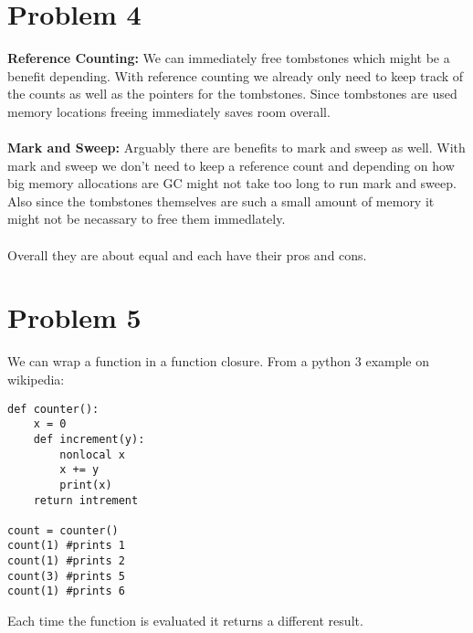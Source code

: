 \documentclass{article}
\begin{document}
\section*{Problem 4}
\textbf{Reference Counting:} We can immediately free tombstones which 
might be a benefit depending. With reference counting we already only need
to keep track of the counts as well as the pointers for the tombstones. 
Since tombstones are used memory locations freeing immediately saves
room overall. \\ \\
\textbf{Mark and Sweep:} Arguably there are benefits to mark and sweep as
well. With mark and sweep we don't need to keep a reference count and depending on how big memory allocations are GC might not take too long to 
run mark and sweep. Also since the tombstones themselves are such a small
amount of memory it might not be necassary to free them immedlately.\\ \\
Overall they are about equal and each have their pros and cons.

\section*{Problem 5}
We can wrap a function in a function closure. From a python 3 example on wikipedia:
\begin{verbatim} 
def counter():
    x = 0
    def increment(y):
        nonlocal x
        x += y
        print(x)
    return intrement
    
count = counter()
count(1) #prints 1
count(1) #prints 2
count(3) #prints 5
count(1) #prints 6

\end{verbatim}

Each time the function is evaluated it returns a different result.
\end{document}

